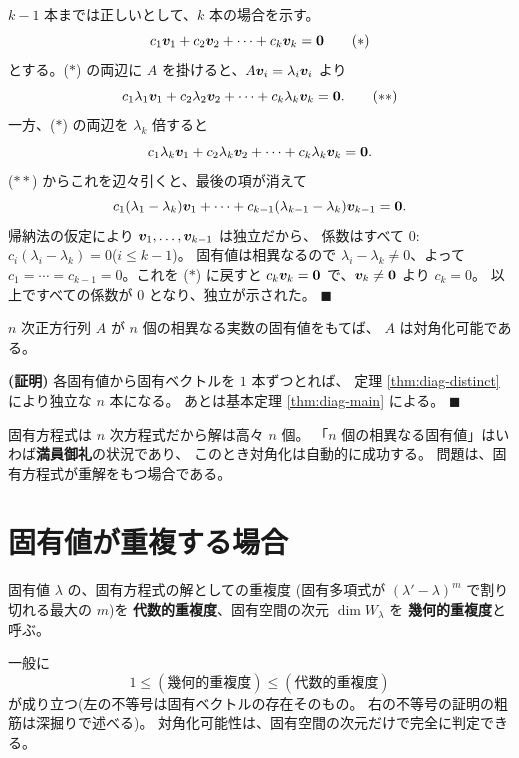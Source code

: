 $k - 1$ 本までは正しいとして、$k$ 本の場合を示す。
\[
c_1\bm{v}_1 + c_2\bm{v}_2 + \cdots + c_k\bm{v}_k = \bm{0}
\tag{$*$}
\]
とする。($*$) の両辺に $A$ を掛けると、$A\bm{v}_i = \lambda_i\bm{v}_i$
より
\[
c_1\lambda_1\bm{v}_1 + c_2\lambda_2\bm{v}_2 + \cdots
+ c_k\lambda_k\bm{v}_k = \bm{0}.
\tag{$**$}
\]
一方、($*$) の両辺を $\lambda_k$ 倍すると
\[
c_1\lambda_k\bm{v}_1 + c_2\lambda_k\bm{v}_2 + \cdots
+ c_k\lambda_k\bm{v}_k = \bm{0}.
\]
($**$) からこれを辺々引くと、最後の項が消えて
\[
c_1(\lambda_1 - \lambda_k)\bm{v}_1 + \cdots
+ c_{k-1}(\lambda_{k-1} - \lambda_k)\bm{v}_{k-1} = \bm{0}.
\]
帰納法の仮定により $\bm{v}_1, \dots, \bm{v}_{k-1}$ は独立だから、
係数はすべて $0$:$c_i(\lambda_i - \lambda_k) = 0$($i \le k - 1$)。
固有値は相異なるので $\lambda_i - \lambda_k \neq 0$、よって
$c_1 = \cdots = c_{k-1} = 0$。これを ($*$) に戻すと
$c_k\bm{v}_k = \bm{0}$ で、$\bm{v}_k \neq \bm{0}$ より $c_k = 0$。
以上ですべての係数が $0$ となり、独立が示された。 $\blacksquare$

\begin{teiri}[$n$ 個の相異なる固有値をもてば対角化可能]\label{thm:diag-ndistinct}
$n$ 次正方行列 $A$ が $n$ 個の相異なる実数の固有値をもてば、
$A$ は対角化可能である。
\end{teiri}

\noindent\textbf{(証明)}\quad
各固有値から固有ベクトルを $1$ 本ずつとれば、
定理 \ref{thm:diag-distinct} により独立な $n$ 本になる。
あとは基本定理 \ref{thm:diag-main} による。 $\blacksquare$

固有方程式は $n$ 次方程式だから解は高々 $n$ 個。
「$n$ 個の相異なる固有値」はいわば\textbf{満員御礼}の状況であり、
このとき対角化は自動的に成功する。
問題は、固有方程式が重解をもつ場合である。

\section{固有値が重複する場合}

\begin{teigi}
固有値 $\lambda$ の、固有方程式の解としての重複度
(固有多項式が $(\lambda' - \lambda)^m$ で割り切れる最大の $m$)を
\textbf{代数的重複度}、固有空間の次元 $\dim W_\lambda$ を
\textbf{幾何的重複度}と呼ぶ。
\end{teigi}

一般に
\[
1 \le (\text{幾何的重複度}) \le (\text{代数的重複度})
\]
が成り立つ(左の不等号は固有ベクトルの存在そのもの。
右の不等号の証明の粗筋は深掘りで述べる)。
対角化可能性は、固有空間の次元だけで完全に判定できる。

